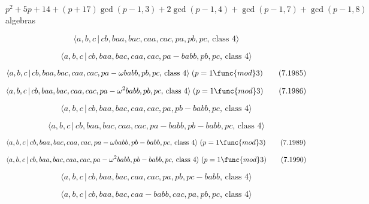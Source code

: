\documentclass[10pt]{article}
\begin{document}
$p^{2}+5p+14+(p+17)\gcd (p-1,3)+2\gcd (p-1,4)+\gcd (p-1,7)+\gcd (p-1,8)$
algebras

\begin{equation}
\langle a,b,c\,|\,cb,baa,bac,caa,cac,pa,pb,pc,\,\text{class }4\rangle 
\tag{7.1983}
\end{equation}

\begin{equation}
\langle a,b,c\,|\,cb,baa,bac,caa,cac,pa-babb,pb,pc,\,\text{class }4\rangle 
\tag{7.1984}
\end{equation}

\begin{equation}
\langle a,b,c\,|\,cb,baa,bac,caa,cac,pa-\omega babb,pb,pc,\,\text{class }%
4\rangle \;(p=1\func{mod}3)  \tag{7.1985}
\end{equation}

\begin{equation}
\langle a,b,c\,|\,cb,baa,bac,caa,cac,pa-\omega ^{2}babb,pb,pc,\,\text{class }%
4\rangle \;(p=1\func{mod}3)  \tag{7.1986}
\end{equation}

\begin{equation}
\langle a,b,c\,|\,cb,baa,bac,caa,cac,pa,pb-babb,pc,\,\text{class }4\rangle 
\tag{7.1987}
\end{equation}

\begin{equation}
\langle a,b,c\,|\,cb,baa,bac,caa,cac,pa-babb,pb-babb,pc,\,\text{class }%
4\rangle  \tag{7.1988}
\end{equation}

\begin{equation}
\langle a,b,c\,|\,cb,baa,bac,caa,cac,pa-\omega babb,pb-babb,pc,\,\text{class 
}4\rangle \;(p=1\func{mod}3)  \tag{7.1989}
\end{equation}

\begin{equation}
\langle a,b,c\,|\,cb,baa,bac,caa,cac,pa-\omega ^{2}babb,pb-babb,pc,\,\text{%
class }4\rangle \;(p=1\func{mod}3)  \tag{7.1990}
\end{equation}

\begin{equation}
\langle a,b,c\,|\,cb,baa,bac,caa,cac,pa,pb,pc-babb,\,\text{class }4\rangle 
\tag{7.1991}
\end{equation}

\begin{equation}
\langle a,b,c\,|\,cb,baa,bac,caa-babb,cac,pa,pb,pc,\,\text{class }4\rangle 
\tag{7.1992}
\end{equation}
\end{document}
